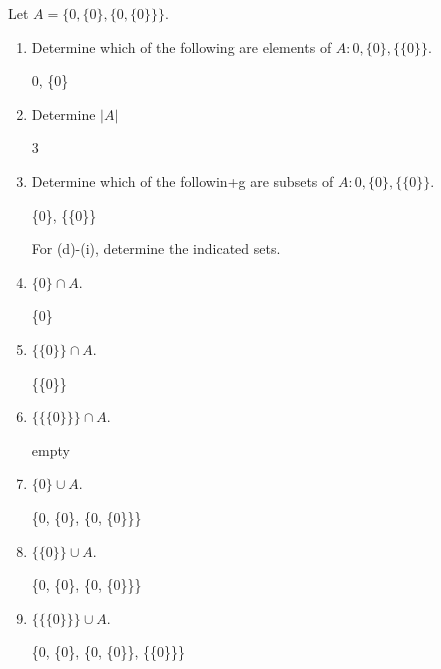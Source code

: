 \documentclass{homework}
\begin{document}
\question Let $A = \{0, \{0\}, \{0, \{0\}\}\}$.
\begin{enumerate}[label=(\alph*)]
    \item Determine which of the following are elements of $A: 0, \{0\}, \{\{0\}\}$.

    \begin{sol}
        0, \{0\}
    \end{sol}

    \item Determine $|A|$

    \begin{sol}
    3
    \end{sol}
    
    \item Determine which of the followin+g are subsets of $A: 0, \{0\}, \{\{0\}\}$.

    \begin{sol}
    \{0\}, \{\{0\}\}
    \end{sol}
    
    For (d)-(i), determine the indicated sets.
    \item $\{0\} \cap A$.

    \begin{sol}
    \{0\}
    \end{sol}
    
    \item $\{\{0\}\} \cap A$.

    \begin{sol}
    \{\{0\}\}
    \end{sol}
    
    \item $\{\{\{0\}\}\} \cap A$.

    \begin{sol}
        empty
    \end{sol}
    
    \item $\{0\} \cup A$.

    \begin{sol}
        \{0, \{0\}, \{0, \{0\}\}\}
    \end{sol}
    
    \item $\{\{0\}\} \cup A$.

    \begin{sol}
    \{0, \{0\}, \{0, \{0\}\}\}
    \end{sol}
    
    \item $\{\{\{0\}\}\} \cup A$.

    \begin{sol}
    \{0, \{0\}, \{0, \{0\}\}, \{\{0\}\}\}
    \end{sol}
\end{enumerate}
\end{document}
